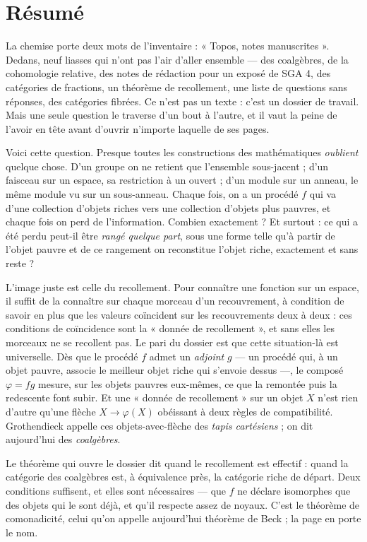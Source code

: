 \documentclass[11pt,a4paper]{article}
\begin{document}
\section*{Résumé}

\begin{resume}
La chemise porte deux mots de l'inventaire : « Topos, notes manuscrites ».
Dedans, neuf liasses qui n'ont pas l'air d'aller ensemble — des coalgèbres, de
la cohomologie relative, des notes de rédaction pour un exposé de SGA 4, des
catégories de fractions, un théorème de recollement, une liste de questions
sans réponses, des catégories fibrées. Ce n'est pas un texte : c'est un dossier
de travail. Mais une seule question le traverse d'un bout à l'autre, et il vaut
la peine de l'avoir en tête avant d'ouvrir n'importe laquelle de ses pages.

Voici cette question. Presque toutes les constructions des mathématiques
\emph{oublient} quelque chose. D'un groupe on ne retient que l'ensemble
sous-jacent ; d'un faisceau sur un espace, sa restriction à un ouvert ; d'un
module sur un anneau, le même module vu sur un sous-anneau. Chaque fois, on a
un procédé $f$ qui va d'une collection d'objets riches vers une collection
d'objets plus pauvres, et chaque fois on perd de l'information. Combien
exactement ? Et surtout : ce qui a été perdu peut-il être \emph{rangé quelque
part}, sous une forme telle qu'à partir de l'objet pauvre et de ce rangement on
reconstitue l'objet riche, exactement et sans reste ?

L'image juste est celle du recollement. Pour connaître une fonction sur un
espace, il suffit de la connaître sur chaque morceau d'un recouvrement, à
condition de savoir en plus que les valeurs coïncident sur les recouvrements
deux à deux : ces conditions de coïncidence sont la « donnée de recollement »,
et sans elles les morceaux ne se recollent pas. Le pari du dossier est que
cette situation-là est universelle. Dès que le procédé $f$ admet un
\emph{adjoint} $g$ — un procédé qui, à un objet pauvre, associe le meilleur
objet riche qui s'envoie dessus —, le composé $\varphi = fg$ mesure, sur les
objets pauvres eux-mêmes, ce que la remontée puis la redescente font subir. Et
une « donnée de recollement » sur un objet $X$ n'est rien d'autre qu'une flèche
$X \to \varphi(X)$ obéissant à deux règles de compatibilité. Grothendieck
appelle ces objets-avec-flèche des \emph{tapis cartésiens} ; on dit aujourd'hui
des \emph{coalgèbres}.

Le théorème qui ouvre le dossier dit quand le recollement est effectif : quand
la catégorie des coalgèbres est, à équivalence près, la catégorie riche de
départ. Deux conditions suffisent, et elles sont nécessaires — que $f$ ne
déclare isomorphes que des objets qui le sont déjà, et qu'il respecte assez de
noyaux. C'est le théorème de comonadicité, celui qu'on appelle aujourd'hui
théorème de Beck ; la page en porte le nom.


\end{resume}
\end{document}
